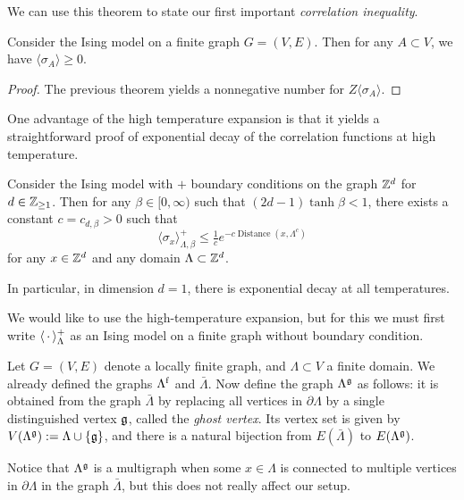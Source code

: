 We can use this theorem to state our first important \emph{correlation inequality}.

\begin{theorem}
    Consider the Ising model on a finite graph $G=(V,E)$.
    Then for any $A\subset V$, we have
    \(
        \langle\sigma_A\rangle\geq 0
    \).
\end{theorem}

\begin{proof}
    The previous theorem yields a nonnegative number for $Z\langle\sigma_A\rangle$.
\end{proof}

One advantage of the high temperature expansion is that it yields a straightforward
proof of exponential decay of the correlation functions at high temperature.

\begin{theorem}
    \label{thm:Exponential decay at high temperature}
    Consider the Ising model with $+$ boundary conditions
    on the graph $\mathbb Z^d$ for $d\in\mathbb Z_{\geq 1}$.
    Then for any $\beta\in[0,\infty)$
    such that $(2d-1)\tanh\beta < 1$,
    there exists a constant $c=c_{d,\beta}>0$
    such that
    \[
        \langle\sigma_x\rangle_{\Lambda,\beta}^+
        \leq \tfrac1ce^{-c \operatorname{Distance}(x,\Lambda^c)}
    \]
    for any $x\in\mathbb Z^d$ and any domain $\Lambda\subset\mathbb Z^d$.

    In particular, in dimension $d=1$, there is exponential decay at all temperatures.
\end{theorem}

We would like to use the high-temperature expansion,
but for this we must first write $\langle\,\cdot\,\rangle^+_\Lambda$
as an Ising model on a finite graph without boundary condition.

\begin{definition}
    \label{definition:ghost}
    Let $G=(V,E)$ denote a locally finite graph,
    and $\Lambda\subset V$ a finite domain.
    We already defined the graphs $\Lambda^{\operatorname{f}}$ and $\bar\Lambda$.
    Now define the graph $\Lambda^\mathfrak g$ as follows:
    it is obtained from the graph $\bar\Lambda$
    by replacing all vertices in $\partial\Lambda$ by a single distinguished
    vertex $\mathfrak g$, called the \emph{ghost vertex}.
    Its vertex set is given by
    \(V(\Lambda^\mathfrak g):=\Lambda\cup\{\mathfrak g\}\),
    and there is a natural bijection from $E(\bar\Lambda)$
    to $E(\Lambda^\mathfrak g)$.

    Notice that $\Lambda^\mathfrak g$ is a multigraph when some $x\in\Lambda$
    is connected to multiple vertices in $\partial\Lambda$ in the graph $\bar\Lambda$,
    but this does not really affect our setup.
\end{definition}

